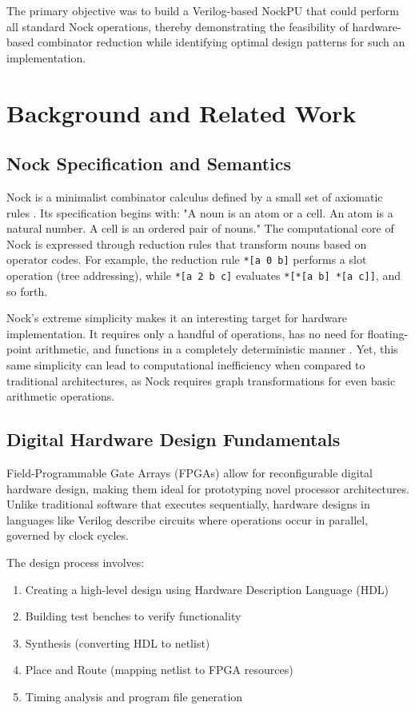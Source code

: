 \documentclass[twoside]{article}
\begin{document}
\noindent
The primary objective was to build a Verilog-based NockPU that could perform all standard Nock operations, thereby demonstrating the feasibility of hardware-based combinator reduction while identifying optimal design patterns for such an implementation.

\section{Background and Related Work}

\subsection{Nock Specification and Semantics}

Nock is a minimalist combinator calculus defined by a small set of axiomatic rules \citep{Nock4K}. Its specification begins with: "A noun is an atom or a cell. An atom is a natural number. A cell is an ordered pair of nouns." The computational core of Nock is expressed through reduction rules that transform nouns based on operator codes. For example, the reduction rule \texttt{*[a 0 b]} performs a slot operation (tree addressing), while \texttt{*[a 2 b c]} evaluates \texttt{*[*[a b] *[a c]]}, and so forth.

Nock's extreme simplicity makes it an interesting target for hardware implementation. It requires only a handful of operations, has no need for floating-point arithmetic, and functions in a completely deterministic manner \citep{Whitepaper}. Yet, this same simplicity can lead to computational inefficiency when compared to traditional architectures, as Nock requires graph transformations for even basic arithmetic operations.

\subsection{Digital Hardware Design Fundamentals}

Field-Programmable Gate Arrays (FPGAs) allow for reconfigurable digital hardware design, making them ideal for prototyping novel processor architectures. Unlike traditional software that executes sequentially, hardware designs in languages like Verilog describe circuits where operations occur in parallel, governed by clock cycles.

The design process involves:
\begin{enumerate}
  \item Creating a high-level design using Hardware Description Language (HDL)
  \item Building test benches to verify functionality
  \item Synthesis (converting HDL to netlist)
  \item Place and Route (mapping netlist to FPGA resources)
  \item Timing analysis and program file generation
\end{enumerate}
\end{document}
